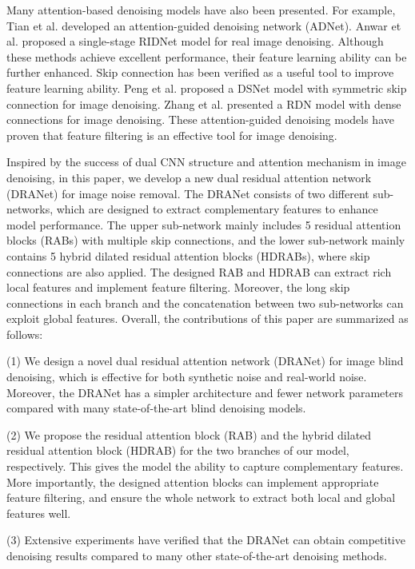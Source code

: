 \documentclass[3p,times]{elsarticle}
\begin{document}
Many attention-based denoising models have also been presented. For example, Tian et al. \cite{TianX2020} developed an attention-guided denoising network (ADNet). Anwar et al. \cite{Anwar2019} proposed a single-stage RIDNet model for real image denoising. Although these methods achieve excellent performance, their feature learning ability can be further enhanced. Skip connection \cite{He2016} has been verified as a useful tool to improve feature learning ability. Peng et al. \cite{Peng2019} proposed a DSNet model with symmetric skip connection for image denoising. Zhang et al. \cite{Zhang2021} presented a RDN model with dense connections for image denoising. These attention-guided denoising models have proven that feature filtering is an effective tool for image denoising.

Inspired by the success of dual CNN structure and attention mechanism in image denoising, in this paper, we develop a new dual residual attention network (DRANet) for image noise removal. The DRANet consists of two different sub-networks, which are designed to extract complementary features to enhance model performance. The upper sub-network mainly includes 5 residual attention blocks (RABs) with multiple skip connections, and the lower sub-network mainly contains 5 hybrid dilated residual attention blocks (HDRABs), where skip connections are also applied. The designed RAB and HDRAB can extract rich local features and implement feature filtering. Moreover, the long skip connections in each branch and the concatenation between two sub-networks can exploit global features. Overall, the contributions of this paper are summarized as follows:

(1) We design a novel dual residual attention network (DRANet) for image blind denoising, which is effective for both synthetic noise and real-world noise. Moreover, the DRANet has a simpler architecture and fewer network parameters compared with many state-of-the-art blind denoising models.

(2) We propose the residual attention block (RAB) and the hybrid dilated residual attention block (HDRAB) for the two branches of our model, respectively. This gives the model the ability to capture complementary features. More importantly, the designed attention blocks can implement appropriate feature filtering, and ensure the whole network to extract both local and global features well.

(3) Extensive experiments have verified that the DRANet can obtain competitive denoising results compared to many other state-of-the-art denoising methods.
\end{document}
